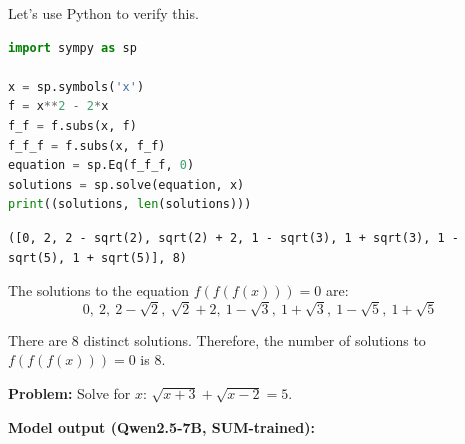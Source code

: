 \documentclass[11pt]{article}
\begin{document}
\begin{tcolorbox}[
    enhanced,
    colback=white, colframe=black!30,
    left=8pt, right=8pt, top=6pt, bottom=6pt,
]
Let's use Python to verify this.
\begin{lstlisting}[language=Python]
import sympy as sp

x = sp.symbols('x')
f = x**2 - 2*x
f_f = f.subs(x, f)
f_f_f = f.subs(x, f_f)
equation = sp.Eq(f_f_f, 0)
solutions = sp.solve(equation, x)
print((solutions, len(solutions)))
\end{lstlisting}
\begin{lstlisting}
([0, 2, 2 - sqrt(2), sqrt(2) + 2, 1 - sqrt(3), 1 + sqrt(3), 1 - sqrt(5), 1 + sqrt(5)], 8)
\end{lstlisting}

The solutions to the equation $f(f(f(x))) = 0$ are:
\[0,\ 2,\ 2 - \sqrt{2},\ \sqrt{2} + 2,\ 1 - \sqrt{3},\ 1 + \sqrt{3},\ 1 - \sqrt{5},\ 1 + \sqrt{5}\]

There are 8 distinct solutions. Therefore, the number of solutions to $f(f(f(x))) = 0$ is $\boxed{8}$.
\end{tcolorbox}

\bigskip
\bigskip

\noindent\textbf{Problem:} Solve for $x$: $\sqrt{x+3} + \sqrt{x-2} = 5$.

\bigskip

\noindent\textbf{Model output (Qwen2.5-7B, SUM-trained):}

\medskip
\end{document}
